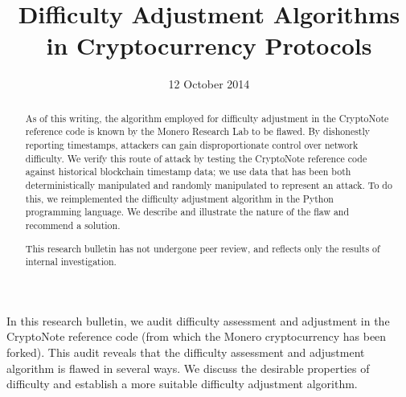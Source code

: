 \documentclass[12pt,english]{mrl}
\theoremstyle{definition}
\numberwithin{equation}{section}
\numberwithin{figure}{section}
\numberwithin{equation}{section}
\numberwithin{equation}{section}
\numberwithin{figure}{section}
\begin{document}
\begin{frontmatter}

\begin{fmbox}
\hfill\setlength{\fboxrule}{0px}\setlength{\fboxsep}{5px}
\title{Difficulty Adjustment Algorithms in Cryptocurrency Protocols}
\date{12 October 2014}
\author[
   addressref={mrl},
   email={lab@monero.cc}
]{ }
\author[
   addressref={mrl}
   email={lab@monero.cc}
]{ }


\address[id=mrl]{
}
\end{fmbox}

\begin{abstractbox}
\begin{abstract}
As of this writing, the algorithm employed for difficulty adjustment in the CryptoNote reference code is known by the Monero Research Lab to be flawed. By dishonestly reporting timestamps, attackers can gain disproportionate control over network difficulty.  We verify this route of attack by testing the CryptoNote reference code against historical blockchain timestamp data; we use data that has been both deterministically manipulated and randomly manipulated to represent an attack. To do this, we reimplemented the difficulty adjustment algorithm in the Python programming language. We describe and illustrate the nature of the flaw and recommend a solution.

This research bulletin has not undergone peer review, and reflects only the results of internal investigation.
\end{abstract}
\end{abstractbox}
\end{frontmatter}

In this research bulletin, we audit difficulty assessment and adjustment in the CryptoNote reference code (from which the Monero cryptocurrency has been forked). This audit reveals that the difficulty assessment and adjustment algorithm is flawed in several ways. We discuss the desirable properties of difficulty and establish a more suitable difficulty adjustment algorithm. 
\end{document}
